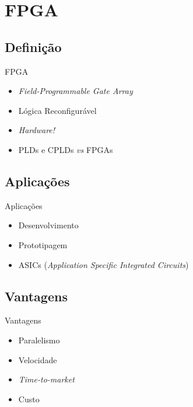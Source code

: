 \subtitle{}



\begin{frame}
\titlepage
\end{frame}


\section{FPGA}
\subsection{Definição}
\begin{frame}{FPGA}
  \begin{itemize}[<+->]
    \item \textit{Field-Programmable Gate Array}
    \item Lógica Reconfigurável
    \item \textit{Hardware!}
    \item PLDs e CPLDs \textit{vs} FPGAs
  \end{itemize}
\end{frame}

\subsection{Aplicações}
\begin{frame}{Aplicações}
  \begin{itemize}[<+->]
    \item Desenvolvimento
    \item Prototipagem
    \item ASICs (\textit{Application Specific Integrated Circuits})
  \end{itemize}
\end{frame}

\subsection{Vantagens}
\begin{frame}{Vantagens}
  \begin{itemize}[<+->]
    \item Paralelismo
    \item Velocidade
    \item \textit{Time-to-market}
    \item Custo
  \end{itemize}
\end{frame}

